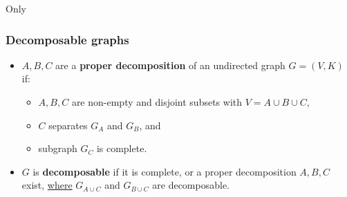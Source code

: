 \begin{frame}{Only} \frametitle{Decomposable graphs}
	\vspace{-2mm}
	\begingroup
	\small
	\begin{itemize}
		\item $A,B,C$ are a \textbf{proper decomposition} 
			of an undirected graph $G = (V,K)$ if:
	\slidesonly{\vspace{-4mm}}
			\begin{itemize}
				\item $A,B,C$ are non-empty and 
					disjoint subsets with $V=A \cup B \cup C$,
				\item $C$ separates $G_A$ and $G_B$, and
				\item subgraph $G_C$ is complete.
			\end{itemize}
		\item $G$ is \textbf{decomposable} if it is complete, 
			or a proper decomposition $A,B,C$ exist,
			\underline{where} $G_{A\cup C}$ and $G_{B \cup C}$ are decomposable.
	\end{itemize}
	\endgroup
	
	\slidesonly{\vspace{-4mm}}
	
	\pause
	

	\slidesonly{\vspace{-9mm}}
	

\end{frame}
